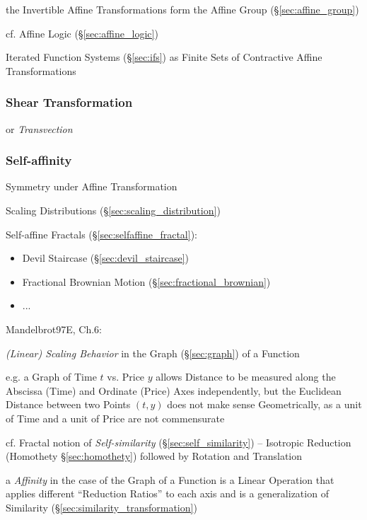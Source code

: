 the Invertible Affine Transformations form the Affine Group
(\S\ref{sec:affine_group})

cf. Affine Logic (\S\ref{sec:affine_logic})

\fist Iterated Function Systems (\S\ref{sec:ifs}) as Finite Sets of Contractive
Affine Transformations



\subsubsection{Shear Transformation}\label{sec:shear_transformation}


or \emph{Transvection}



\subsubsection{Self-affinity}\label{sec:self_affinity}

Symmetry under Affine Transformation

\fist Scaling Distributions (\S\ref{sec:scaling_distribution})

\fist Self-affine Fractals (\S\ref{sec:selfaffine_fractal}):
\begin{itemize}
  \item Devil Staircase (\S\ref{sec:devil_staircase})
  \item Fractional Brownian Motion (\S\ref{sec:fractional_brownian})
  \item ...
\end{itemize}

Mandelbrot97E, Ch.6:

\emph{(Linear) Scaling Behavior} in the Graph (\S\ref{sec:graph}) of a Function

e.g. a Graph of Time $t$ vs. Price $y$ allows Distance to be measured along the
Abscissa (Time) and Ordinate (Price) Axes independently, but the Euclidean
Distance between two Points $(t, y)$ does not make sense Geometrically, as a
unit of Time and a unit of Price are not commensurate

\fist cf. Fractal notion of \emph{Self-similarity} (\S\ref{sec:self_similarity})
-- Isotropic Reduction (Homothety \S\ref{sec:homothety}) followed by Rotation
and Translation

a \emph{Affinity} in the case of the Graph of a Function is a Linear Operation
that applies different ``Reduction Ratios'' to each axis and is a generalization
of Similarity (\S\ref{sec:similarity_transformation})

